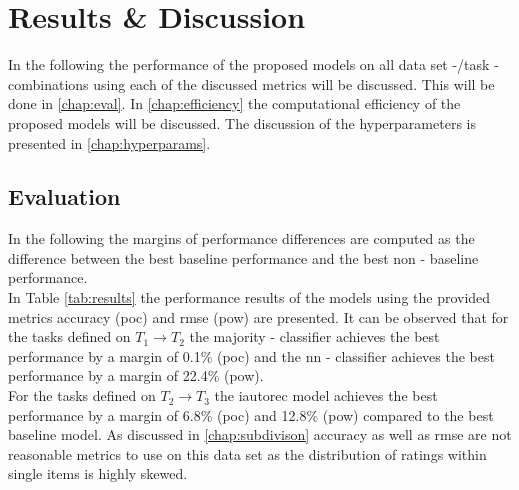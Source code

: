 \section{Results \& Discussion}
\label{sec:results}
In the following the performance of the proposed models on all data set -/task - combinations using each of the discussed metrics will be discussed. This will be done in \autoref{chap:eval}. In \autoref{chap:efficiency} the computational efficiency of the proposed models will be discussed. The discussion of the hyperparameters is presented in \autoref{chap:hyperparams}.

\subsection{Evaluation}
\label{chap:eval}
In the following the margins of performance differences are computed as the difference between the best baseline performance and the best non - baseline performance.\\ 

\noindent In Table \ref{tab:results} the performance results of the models using the provided metrics accuracy (\acrshort{poc}) and \acrshort{rmse} (\acrshort{pow}) are presented. It can be observed that for the tasks defined on $T_1 \to T_2$ the majority - classifier achieves the best performance by a margin of 0.1\% (\acrshort{poc}) and the \acrfull{nn} - classifier achieves the best performance by a margin of 22.4\% (\acrshort{pow}).\\ For the tasks defined on $T_2 \to T_3$ the \acrshort{iautorec} model achieves the best performance by a margin of 6.8\% (\acrshort{poc}) and 12.8\% (\acrshort{pow}) compared to the best baseline model. As discussed in \ref{chap:subdivison} accuracy as well as \acrshort{rmse} are not reasonable metrics to use on this data set as the distribution of ratings within single items is highly skewed.


